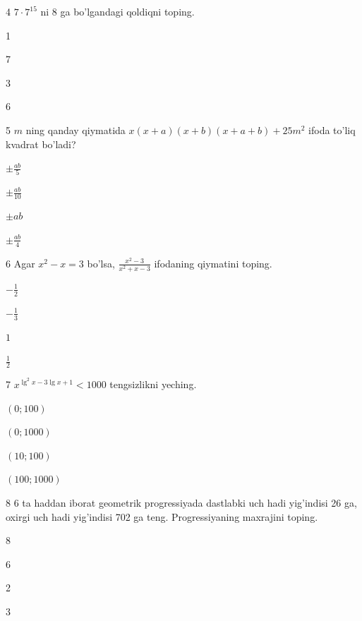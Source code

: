 \documentclass[14pt]{article}
\begin{document}
\begin{questionbox}{4}
    \(7 \cdot 7^{15}\) ni 8 ga bo'lgandagi qoldiqni toping.
    \begin{options}
        \item 1
        \item 7
        \item 3
        \item 6
    \end{options}
\end{questionbox}

\begin{questionbox}{5}
    \(m\) ning qanday qiymatida \(x(x + a)(x + b)(x + a + b) + 25m^2\) ifoda to'liq kvadrat bo'ladi?
    \begin{options}
        \item \(\pm \frac{ab}{5}\)
        \item \(\pm \frac{ab}{10}\)
        \item \(\pm ab\)
        \item \(\pm \frac{ab}{4}\)
    \end{options}
\end{questionbox}

\begin{questionbox}{6}
    Agar \(x^2 - x = 3\) bo'lsa, \(\frac{x^2 -3}{x^2+x-3}\) ifodaning qiymatini toping.
    \begin{options}
        \item \(-\frac{1}{2}\)
        \item \(-\frac{1}{3}\)
        \item \(1\)
        \item \(\frac{1}{2}\)
    \end{options}
\end{questionbox}

\begin{questionbox}{7}
    \(x^{\lg^2 x - 3\lg x + 1} < 1000\) tengsizlikni yeching.
    \begin{options}
        \item \((0; 100)\)
        \item \((0; 1000)\)
        \item \((10; 100)\)
        \item \((100; 1000)\)
    \end{options}
\end{questionbox}

\begin{questionbox}{8}
    6 ta haddan iborat geometrik progressiyada dastlabki uch hadi yig'indisi 26 ga, oxirgi uch hadi yig'indisi 702 ga teng. Progressiyaning maxrajini toping.
    \begin{options}
        \item 8
        \item 6
        \item 2
        \item 3
    \end{options}
\end{questionbox}
\end{document}
